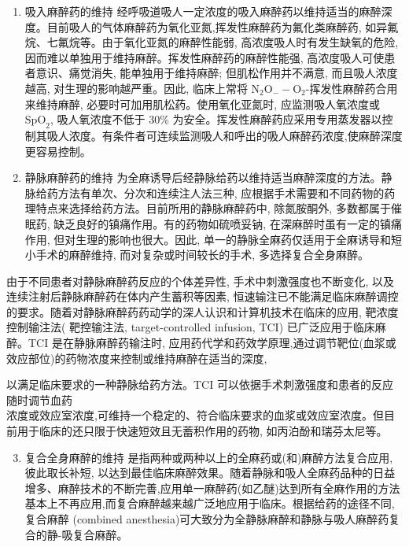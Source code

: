 \documentclass[10pt]{article}
\begin{document}
\begin{enumerate}
  \item 吸入麻醉药的维持 经呼吸道吸人一定浓度的吸入麻醉药以维持适当的麻醉深度。目前吸人的气体麻醉药为氧化亚氮,挥发性麻醉药为氟化类麻醉药, 如异氟烷、七氟烷等。由于氧化亚氮的麻醉性能弱, 高浓度吸人时有发生缺氧的危险, 因而难以单独用于维持麻醉。挥发性麻醉药的麻醉性能强, 高浓度吸人可使患者意识、痛觉消失, 能单独用于维持麻醉; 但肌松作用并不满意, 而且吸人浓度越高, 对生理的影响越严重。因此, 临床上常将 $\mathrm{N}_{2} \mathrm{O}_{-}-\mathrm{O}_{2}$-挥发性麻醉药合用来维持麻醉, 必要时可加用肌松药。使用氧化亚氮时, 应监测吸人氧浓度或 $\mathrm{SpO}_{2}$, 吸人氧浓度不低于 $30 \%$ 为安全。挥发性麻醉药应采用专用蒸发器以控制其吸人浓度。有条件者可连续监测吸人和呼出的吸人麻醉药浓度,使麻醉深度更容易控制。

  \item 静脉麻醉药的维持 为全麻诱导后经静脉给药以维持适当麻醉深度的方法。静脉给药方法有单次、分次和连续注人法三种, 应根据手术需要和不同药物的药理特点来选择给药方法。目前所用的静脉麻醉药中, 除氮胺酮外, 多数都属于催眠药, 缺乏良好的镇痛作用。有的药物如硫喷妥钠, 在深麻醉时虽有一定的镇痛作用, 但对生理的影响也很大。因此, 单一的静脉全麻药仅适用于全麻诱导和短小手术的麻醉维持, 而对复杂或时间较长的手术, 多选择复合全身麻醉。

\end{enumerate}

由于不同患者对静脉麻醉药反应的个体差异性, 手术中刺激强度也不断变化, 以及连续注射后静脉麻醉药在体内产生蓄积等因素, 恒速输注已不能满足临床麻醉调控的要求。随着对静脉麻醉药药动学的深人认识和计算机技术在临床的应用, 靶浓度控制输注法( 靶控输注法, target-controlled infusion, TCI) 已广泛应用于临床麻醉。TCI 是在静脉麻醉药输注时, 应用药代学和药效学原理,通过调节靶位(血浆或效应部位)的药物浓度来控制或维持麻醉在适当的深度,

以满足临床要求的一种静脉给药方法。TCI 可以依据手术刺激强度和患者的反应随时调节血药\\
浓度或效应室浓度,可维持一个稳定的、符合临床要求的血浆或效应室浓度。但目前用于临床的还只限于快速短效且无蓄积作用的药物, 如丙泊酚和瑞芬太尼等。

\begin{enumerate}
  \setcounter{enumi}{2}
  \item 复合全身麻醉的维持 是指两种或两种以上的全麻药或(和)麻醉方法复合应用, 彼此取长补短, 以达到最佳临床麻醉效果。随着静脉和吸人全麻药品种的日益增多、麻醉技术的不断完善,应用单一麻醉药(如乙醚)达到所有全麻作用的方法基本上不再应用,而复合麻醉越来越广泛地应用于临床。根据给药的途径不同,复合麻醉 (combined anesthesia)可大致分为全静脉麻醉和静脉与吸人麻醉药复合的静-吸复合麻醉。
\end{enumerate}
\end{document}
